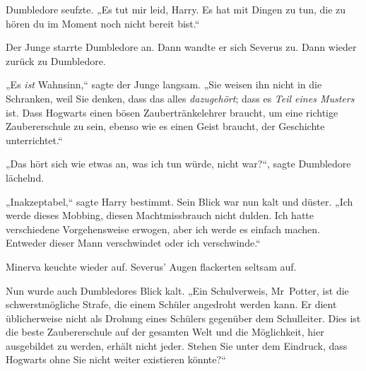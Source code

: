 Dumbledore seufzte. „Es tut mir leid, Harry. Es hat mit Dingen zu tun, die zu hören du im Moment noch nicht bereit bist.“

Der Junge starrte Dumbledore an. Dann wandte er sich Severus zu. Dann wieder zurück zu Dumbledore.

„Es \emph{ist} Wahnsinn,“ sagte der Junge langsam. „Sie weisen ihn nicht in die Schranken, weil Sie denken, dass das alles \emph{dazugehört}; dass es \emph{Teil eines Musters} ist. Dass Hogwarts einen bösen Zaubertränkelehrer braucht, um eine richtige Zaubererschule zu sein, ebenso wie es einen Geist braucht, der Geschichte unterrichtet.“

„Das hört sich wie etwas an, was ich tun würde, nicht war?“, sagte Dumbledore lächelnd.

„Inakzeptabel,“ sagte Harry bestimmt. Sein Blick war nun kalt und düster. „Ich werde dieses Mobbing, diesen Machtmissbrauch nicht dulden. Ich hatte verschiedene Vorgehensweise erwogen, aber ich werde es einfach machen. Entweder dieser Mann verschwindet oder ich verschwinde.“

Minerva keuchte wieder auf. Severus’ Augen flackerten seltsam auf.

Nun wurde auch Dumbledores Blick kalt. „Ein Schulverweis, Mr~Potter, ist die schwerstmögliche Strafe, die einem Schüler angedroht werden kann. Er dient üblicherweise nicht als Drohung eines Schülers gegenüber dem Schulleiter. Dies ist die beste Zaubererschule auf der gesamten Welt und die Möglichkeit, hier ausgebildet zu werden, erhält nicht jeder. Stehen Sie unter dem Eindruck, dass Hogwarts ohne Sie nicht weiter existieren könnte?“

